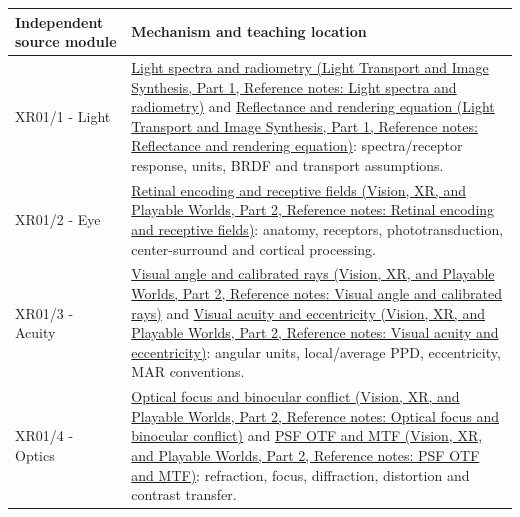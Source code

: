 {\def\LTcaptype{none} %
\begin{longtable}[]{@{}
  >{\raggedright\arraybackslash}p{}
  >{\raggedright\arraybackslash}p{}@{}}
\toprule\noalign{}
\begin{minipage}[b]{\linewidth}\raggedright
Independent source module
\end{minipage} & \begin{minipage}[b]{\linewidth}\raggedright
Mechanism and teaching location
\end{minipage} \\
\midrule\noalign{}
\endhead
\bottomrule\noalign{}
\endlastfoot
XR01/1 - Light & \href{../04-Light-Transport-and-Image-Synthesis-P01/main.pdf\#nameddest=appendix-215c2570199b}{Light spectra and radiometry (Light Transport and Image Synthesis, Part 1, Reference notes: Light spectra and radiometry)} and \href{../04-Light-Transport-and-Image-Synthesis-P01/main.pdf\#nameddest=appendix-96da0b153b77}{Reflectance and rendering equation (Light Transport and Image Synthesis, Part 1, Reference notes: Reflectance and rendering equation)}: spectra/receptor response, units, BRDF and transport assumptions. \\
XR01/2 - Eye & \href{../07-Vision-XR-and-Playable-Worlds-P02/main.pdf\#nameddest=appendix-7281c15ac44a}{Retinal encoding and receptive fields (Vision, XR, and Playable Worlds, Part 2, Reference notes: Retinal encoding and receptive fields)}: anatomy, receptors, phototransduction, center-surround and cortical processing. \\
XR01/3 - Acuity & \href{../07-Vision-XR-and-Playable-Worlds-P02/main.pdf\#nameddest=appendix-7d356c396d1a}{Visual angle and calibrated rays (Vision, XR, and Playable Worlds, Part 2, Reference notes: Visual angle and calibrated rays)} and \href{../07-Vision-XR-and-Playable-Worlds-P02/main.pdf\#nameddest=appendix-b491fc48c54b}{Visual acuity and eccentricity (Vision, XR, and Playable Worlds, Part 2, Reference notes: Visual acuity and eccentricity)}: angular units, local/average PPD, eccentricity, MAR conventions. \\
XR01/4 - Optics & \href{../07-Vision-XR-and-Playable-Worlds-P02/main.pdf\#nameddest=appendix-f90cee1be7a4}{Optical focus and binocular conflict (Vision, XR, and Playable Worlds, Part 2, Reference notes: Optical focus and binocular conflict)} and \href{../07-Vision-XR-and-Playable-Worlds-P02/main.pdf\#nameddest=appendix-8b76b0efd27f}{PSF OTF and MTF (Vision, XR, and Playable Worlds, Part 2, Reference notes: PSF OTF and MTF)}: refraction, focus, diffraction, distortion and contrast transfer. \\

\end{longtable}}
